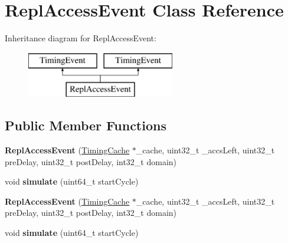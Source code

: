 \hypertarget{classReplAccessEvent}{\section{Repl\-Access\-Event Class Reference}
\label{classReplAccessEvent}
}
Inheritance diagram for Repl\-Access\-Event\-:\begin{figure}[H]
\begin{center}
\leavevmode
\includegraphics[height=2.000000cm]{classReplAccessEvent}
\end{center}
\end{figure}
\subsection*{Public Member Functions}
\begin{DoxyCompactItemize}
\item 
\hypertarget{classReplAccessEvent_a5a321766248c6573494a2063a112e890}{{\bfseries Repl\-Access\-Event} (\hyperlink{classTimingCache}{Timing\-Cache} $\ast$\-\_\-cache, uint32\-\_\-t \-\_\-accs\-Left, uint32\-\_\-t pre\-Delay, uint32\-\_\-t post\-Delay, int32\-\_\-t domain)}\label{classReplAccessEvent_a5a321766248c6573494a2063a112e890}

\item 
\hypertarget{classReplAccessEvent_ac43826b5f3c369ff3e8853aa2e789b37}{void {\bfseries simulate} (uint64\-\_\-t start\-Cycle)}\label{classReplAccessEvent_ac43826b5f3c369ff3e8853aa2e789b37}

\item 
\hypertarget{classReplAccessEvent_a5a321766248c6573494a2063a112e890}{{\bfseries Repl\-Access\-Event} (\hyperlink{classTimingCache}{Timing\-Cache} $\ast$\-\_\-cache, uint32\-\_\-t \-\_\-accs\-Left, uint32\-\_\-t pre\-Delay, uint32\-\_\-t post\-Delay, int32\-\_\-t domain)}\label{classReplAccessEvent_a5a321766248c6573494a2063a112e890}

\item 
\hypertarget{classReplAccessEvent_ac43826b5f3c369ff3e8853aa2e789b37}{void {\bfseries simulate} (uint64\-\_\-t start\-Cycle)}\label{classReplAccessEvent_ac43826b5f3c369ff3e8853aa2e789b37}

\end{DoxyCompactItemize}
